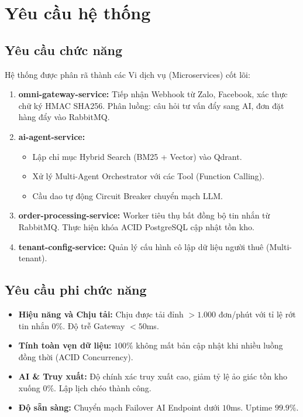 \section{Yêu cầu hệ thống}

\subsection{Yêu cầu chức năng}
Hệ thống được phân rã thành các Vi dịch vụ (Microservices) cốt lõi:
\begin{enumerate}
    \item \textbf{omni-gateway-service:} Tiếp nhận Webhook từ Zalo, Facebook, xác thực chữ ký HMAC SHA256. Phân luồng: câu hỏi tư vấn đẩy sang AI, đơn đặt hàng đẩy vào RabbitMQ.
    \item \textbf{ai-agent-service:} 
    \begin{itemize}
        \item Lập chỉ mục Hybrid Search (BM25 + Vector) vào Qdrant.
        \item Xử lý Multi-Agent Orchestrator với các Tool (Function Calling).
        \item Cầu dao tự động Circuit Breaker chuyển mạch LLM.
    \end{itemize}
    \item \textbf{order-processing-service:} Worker tiêu thụ bất đồng bộ tin nhắn từ RabbitMQ. Thực hiện khóa ACID PostgreSQL cập nhật tồn kho.
    \item \textbf{tenant-config-service:} Quản lý cấu hình cô lập dữ liệu người thuê (Multi-tenant).
\end{enumerate}

\subsection{Yêu cầu phi chức năng}
\begin{itemize}
    \item \textbf{Hiệu năng và Chịu tải:} Chịu được tải đỉnh $> 1.000$ đơn/phút với tỉ lệ rớt tin nhắn $0\%$. Độ trễ Gateway $< 50$ms.
    \item \textbf{Tính toàn vẹn dữ liệu:} $100\%$ không mất bản cập nhật khi nhiều luồng đồng thời (ACID Concurrency).
    \item \textbf{AI \& Truy xuất:} Độ chính xác truy xuất cao, giảm tỷ lệ ảo giác tồn kho xuống $0\%$. Lập lịch chéo thành công.
    \item \textbf{Độ sẵn sàng:} Chuyển mạch Failover AI Endpoint dưới $10$ms. Uptime $99.9\%$.
\end{itemize}
